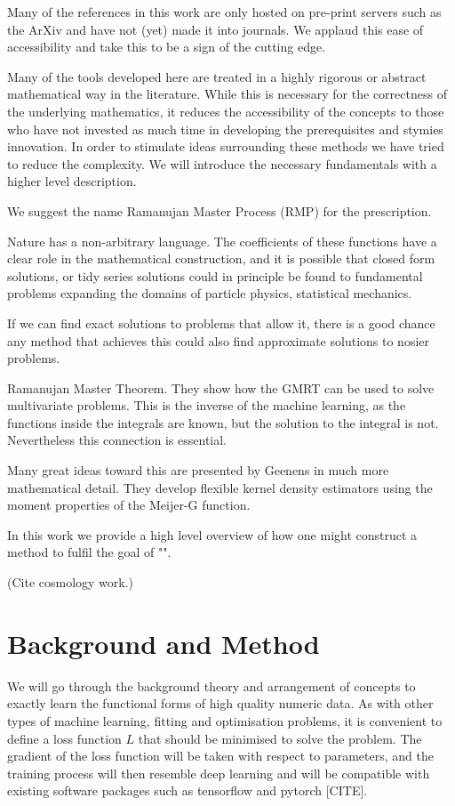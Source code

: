 \documentclass{article}
\begin{document}
Many of the references in this work are only hosted on pre-print servers such as the ArXiv and have not (yet) made it into journals. We applaud this ease of accessibility and take this to be a sign of the cutting edge.


Many of the tools developed here are treated in a highly rigorous or abstract mathematical way in the literature. While this is necessary for the correctness of the underlying mathematics, it reduces the accessibility of the concepts to those who have not invested as much time in developing the prerequisites and stymies innovation. In order to stimulate ideas surrounding these methods we have tried to reduce the complexity. We will introduce the necessary fundamentals with a higher level description. 


{\color{red} We suggest the name Ramanujan Master Process (RMP) for the prescription.

Nature has a non-arbitrary language. The coefficients of these functions have a clear role in the mathematical construction, and it is possible that closed form solutions, or tidy series solutions could in principle be found to fundamental problems expanding the domains of particle physics, statistical mechanics.

If we can find exact solutions to problems that allow it, there is a good chance any method that achieves this could also find approximate solutions to nosier problems.

Ramanujan Master Theorem. \citep{Gonzalez2015}
They show how the GMRT can be used to solve multivariate problems. This is the inverse of the machine learning, as the functions inside the integrals are known, but the solution to the integral is not. Nevertheless this connection is essential.

Many great ideas toward this are presented by Geenens \citep{Geenens2017} in much more mathematical detail. They develop flexible kernel density estimators using the moment properties of the Meijer-G function.

}

{\color{red} In this work we provide a high level overview of how one might construct a method to fulfil the goal of "". }

(Cite cosmology work.)


\section{Background and Method}
We will go through the background theory and arrangement of concepts to exactly learn the functional forms of high quality numeric data. As with other types of machine learning, fitting and optimisation problems, it is convenient to define a loss function $L$ that should be minimised to solve the problem. The gradient of the loss function will be taken with respect to parameters, and the training process will then resemble deep learning and will be compatible with existing software packages such as tensorflow and pytorch {\color{red} [CITE]}.
 
\end{document}
